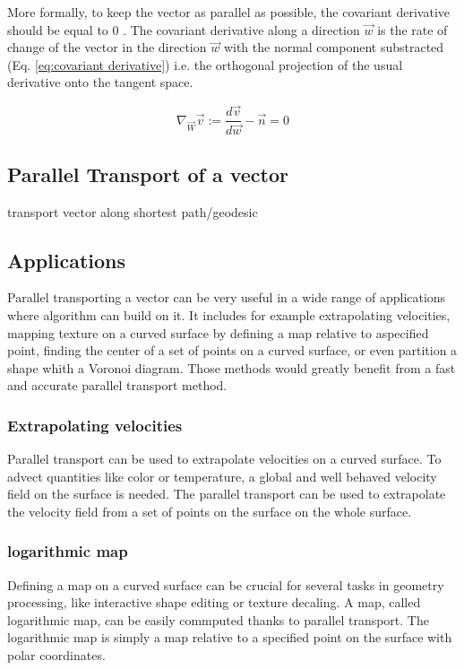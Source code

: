 \documentclass[sigconf]{acmart}
\begin{document}
More formally, to keep the vector as parallel as possible, the covariant derivative should be equal to 0 \cite{youtube_video}. The covariant derivative along a direction $\vec{w} $ is the rate of change of the vector in the direction $\vec{w}$ with the normal component substracted (Eq. \ref{eq:covariant derivative}) i.e. the orthogonal projection of the usual derivative onto the tangent space.

\begin{equation}
  \nabla_{\vec{W}}\vec{v}:=\frac{d\vec{v}}{d\vec{w}}-\vec{n}=0
  \label{eq:covariant derivative}
\end{equation}

\subsection{Parallel Transport of a vector}

transport vector along shortest path/geodesic

\subsection{Applications}
Parallel transporting a vector can be very useful in a wide range of applications where algorithm can build on it. It includes for example extrapolating velocities, mapping texture on a curved surface by defining a map relative to aspecified point, finding the center of a set of points on a curved surface, or even partition a shape whith a Voronoi diagram. Those methods would greatly benefit from a fast and accurate parallel transport method.

\subsubsection{Extrapolating velocities}
Parallel transport can be used to extrapolate velocities on a curved surface. To advect quantities like color or temperature, a global and well behaved velocity field on the surface is needed. The parallel transport can be used to extrapolate the velocity field from a set of points on the surface on the whole surface.

\subsubsection{logarithmic map}
Defining a map on a curved surface can be crucial for several tasks in geometry processing, like interactive shape editing or texture decaling. A map, called logarithmic map, can be easily commputed thanks to parallel transport. The logarithmic map is simply a map relative to a specified point on the surface with polar coordinates. 
\end{document}
